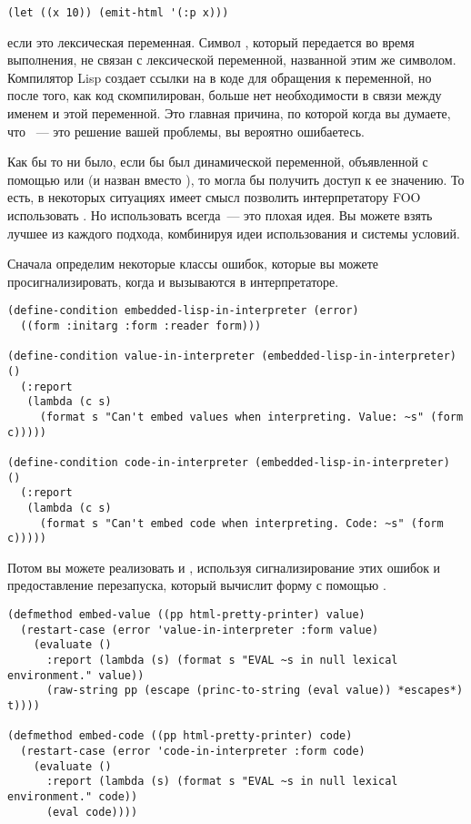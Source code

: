 \begin{lstlisting}
(let ((x 10)) (emit-html '(:p x)))
\end{lstlisting}

если  это лексическая переменная. Символ , который передается
 во время выполнения, не связан с лексической переменной, названной этим
же символом. Компилятор Lisp создает ссылки на  в коде для обращения к переменной,
но после того, как код скомпилирован, больше нет необходимости в связи между именем
 и этой переменной. Это главная причина, по которой когда вы думаете, что
~--- это решение вашей проблемы, вы вероятно ошибаетесь.

Как бы то ни было, если бы  был динамической переменной, объявленной с помощью
 или  (и назван  вместо ), то
 могла бы получить доступ к ее значению.  То есть, в некоторых ситуациях имеет
смысл позволить интерпретатору FOO использовать . Но использовать 
всегда~--- это плохая идея. Вы можете взять лучшее из каждого подхода, комбинируя идеи
использования  и системы условий.

Сначала определим некоторые классы ошибок, которые вы можете просигнализировать,
когда и  вызываются в интерпретаторе.

\begin{lstlisting}
(define-condition embedded-lisp-in-interpreter (error)
  ((form :initarg :form :reader form)))

(define-condition value-in-interpreter (embedded-lisp-in-interpreter) ()
  (:report
   (lambda (c s) 
     (format s "Can't embed values when interpreting. Value: ~s" (form c)))))

(define-condition code-in-interpreter (embedded-lisp-in-interpreter) ()
  (:report
   (lambda (c s) 
     (format s "Can't embed code when interpreting. Code: ~s" (form c)))))
\end{lstlisting}

Потом вы можете реализовать  и , используя
сигнализирование этих ошибок и предоставление перезапуска, который вычислит форму с
помощью .

\begin{lstlisting}
(defmethod embed-value ((pp html-pretty-printer) value)
  (restart-case (error 'value-in-interpreter :form value)
    (evaluate ()
      :report (lambda (s) (format s "EVAL ~s in null lexical environment." value))
      (raw-string pp (escape (princ-to-string (eval value)) *escapes*) t))))

(defmethod embed-code ((pp html-pretty-printer) code)
  (restart-case (error 'code-in-interpreter :form code)
    (evaluate ()
      :report (lambda (s) (format s "EVAL ~s in null lexical environment." code))
      (eval code))))
\end{lstlisting}

